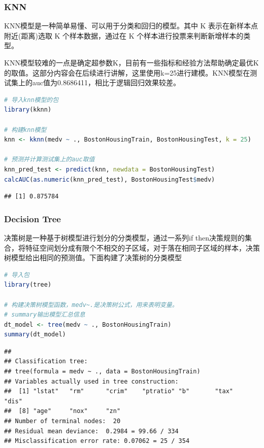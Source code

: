\documentclass[]{ctexbook}
\begin{document}
\hypertarget{knn}{%
\subsubsection{KNN}\label{knn}}

KNN模型是一种简单易懂、可以用于分类和回归的模型。其中 K 表示在新样本点附近(距离)选取 K 个样本数据，通过在 K 个样本进行投票来判断新增样本的类型。

KNN模型较难的一点是确定超参数K，目前有一些指标和经验方法帮助确定最优K的取值。这部分内容会在后续进行讲解，这里使用k=25进行建模。KNN模型在测试集上的auc值为0.8686411，相比于逻辑回归效果较差。

\begin{lstlisting}[language=R]
# 导入knn模型的包
library(kknn)

# 构建knn模型
knn <- kknn(medv ~ ., BostonHousingTrain, BostonHousingTest, k = 25)

# 预测并计算测试集上的auc取值
knn_pred_test <- predict(knn, newdata = BostonHousingTest)
calcAUC(as.numeric(knn_pred_test), BostonHousingTest$medv)
\end{lstlisting}

\begin{lstlisting}
## [1] 0.875784
\end{lstlisting}

\hypertarget{decision-tree}{%
\subsubsection{Decision Tree}\label{decision-tree}}

决策树是一种基于树模型进行划分的分类模型，通过一系列if then决策规则的集合，将特征空间划分成有限个不相交的子区域，对于落在相同子区域的样本，决策树模型给出相同的预测值。下面构建了决策树的分类模型

\begin{lstlisting}[language=R]
# 导入包
library(tree)

# 构建决策树模型函数，medv~.是决策树公式，用来表明变量。
# summary输出模型汇总信息
dt_model <- tree(medv ~ ., BostonHousingTrain)
summary(dt_model)
\end{lstlisting}

\begin{lstlisting}
## 
## Classification tree:
## tree(formula = medv ~ ., data = BostonHousingTrain)
## Variables actually used in tree construction:
##  [1] "lstat"   "rm"      "crim"    "ptratio" "b"       "tax"     "dis"    
##  [8] "age"     "nox"     "zn"     
## Number of terminal nodes:  20 
## Residual mean deviance:  0.2984 = 99.66 / 334 
## Misclassification error rate: 0.07062 = 25 / 354
\end{lstlisting}
\end{document}
